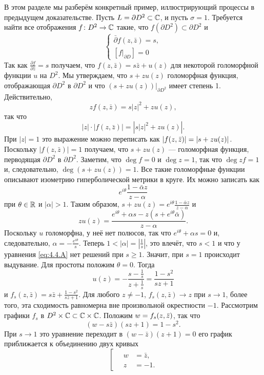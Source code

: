 В этом разделе мы разберём конкретный пример, иллюстрирующий процессы в предыдущем доказательстве.
Пусть $L = \partial D^2 \subset \mathbb{C}$, и пусть $\sigma = 1$.
Требуется найти все отображения $f\colon D^2 \to \mathbb{C}$ такие, что $f
(\partial D^2) \subset \partial D^2$ и 
\begin{equation}
\begin{cases}
\bar\partial f(z,\bar z)=s,
\\
[f|_{\partial D}]=0
\end{cases}
\label{eq:4.4.A}
\end{equation}
Так как $\tfrac{\partial f}{\partial \bar z} = s$ получаем, что $f (z,
\bar z) = s\bar z + u (z)$ для некоторой голоморфной функции $u$ на
$D^2$. 
Мы утверждаем, что $s+ zu (z)$ голоморфная функция, отображающая
$\partial D^2$ в $\partial D^2$ и что $(s+ zu (z))|_{\partial D^2}$
имеет степень 1. 
Действительно, 
\[zf (z,\bar z) = s | z |^2 + zu (z),\]
так что
\[|z|{\cdot}| f (z, \bar z) | = \left| s \left| z \right|^{2} + zu (z)\right|.\]
При $|z|=1$ это выражение можно переписать как
$|f(z,\bar z)|=|s\z+zu(z)|$.
Поскольку $|f(z,\bar z)|=1$ получаем, что $s+zu(z)$ — голоморфная функция, перводящая $\partial D^2$ в $\partial D^2$.
Заметим, что $\deg f = 0$ и $\deg z = 1$, так что $\deg zf= 1 $ и, следовательно, $\deg (s + zu (z)) = 1$.
Все такие голоморфные функции описывают изометрию гиперболической метрики в круге.
Их можно записать как
\[e^{i\theta}\frac{1 - \bar\alpha z}{z-\alpha}\]
при $\theta \in \mathbb{R}$ и $| \alpha | > 1$.
Таким образом, $s + zu (z) = e^{i\theta}\frac{1 - \bar\alpha z}{z-\alpha}$ и 
\[zu (z)
=
\frac{e^{i\theta} + \alpha s - z (s + e^{i\theta} \bar\alpha)}{z-\alpha}.\]
Поскольку $u$ голоморфна, у неё нет полюсов, так что $e^{i\theta} + \alpha s = 0$ и, следовательно, $\alpha =-\frac{e^{i\theta}}{s}$.
Теперь $1 <| \alpha | = | \tfrac1s |$, это влечёт, что $s<1$ и что у уравнения \ref{eq:4.4.A} нет решений при $s \ge 1$.
Значит, при $s = 1$ происходит выдувание.
Для простоты положим $\theta = 0$.
Тогда 
\[u(z)
=
-\frac{s-\frac1s}{z+\frac1s}
=
\frac{1-s^2}{sz+1}\]
и $f_s(z,\bar z)=s\bar z+\frac{1-s^2}{sz+1}$.
Для любого $z \ne -1$, $f_s (z, \bar z) \to z$ при $s\to1$, 
более того, эта сходимость равномерна вне произвольной окрестности $-1$.
Рассмотрим графики $f_s$ в $D^2 \times \mathbb{C} \subset \mathbb{C} \times
  \mathbb{C}$.
Положим $w \z= f_s (z, \bar z)$, так что 
\[(w - s\bar z) (sz + 1) = 1 - s^2.\]
При $s \to 1$ это уравнение переходит в $(w - \bar z) (z + 1) = 0$ его график приближается к объединению двух кривых 
\[
\left[
\begin{aligned}
\quad w&=\bar z,
\\
\quad z&=-1.
\end{aligned}
\right.
\]

